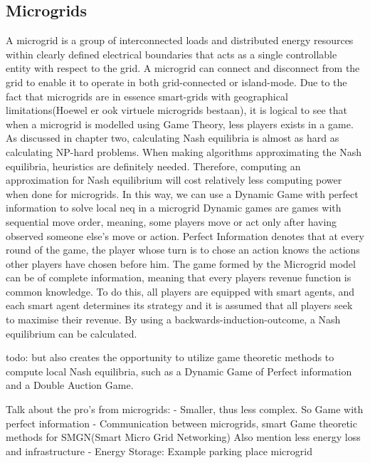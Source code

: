 \subsection{Microgrids}
A microgrid is a group of interconnected loads and distributed energy resources within clearly defined electrical boundaries that acts as a single controllable entity with respect to the grid. A microgrid can connect and disconnect from the grid to enable it to operate in both grid-connected or island-mode.
Due to the fact that microgrids are in essence smart-grids with geographical limitations(Hoewel er ook virtuele microgrids bestaan), it is logical to see that when a microgrid is modelled using Game Theory, less players exists in a game. As discussed in chapter two, calculating Nash equilibria is almost as hard as calculating NP-hard problems. When making algorithms approximating the Nash equilibria, heuristics are definitely needed. Therefore, computing an approximation for Nash equilibrium will cost relatively less computing power when done for microgrids. In this way, we can use a Dynamic Game with perfect information to solve local \ac{neq} in a microgrid
Dynamic games are games with sequential move order, meaning, some players move or act only after having observed someone else’s move or action. Perfect Information denotes that at every round of the game, the player whose turn is to chose an action knows the actions other players have chosen before him. The game formed by the Microgrid model can be of complete information, meaning that every players revenue function is common knowledge.
To do this, all players are equipped with smart agents, and each smart agent determines its strategy and it is assumed that all players seek to maximise their revenue. By using a backwards-induction-outcome, a Nash equilibrium can be calculated.\cite{MicrogridModellingPetrosAristidou}

todo: 
but also creates the opportunity to utilize game theoretic methods to compute local Nash equilibria, such as a Dynamic Game of Perfect information and a Double Auction Game.


Talk about the pro's from microgrids:
 - Smaller, thus less complex. So Game with perfect information
 - Communication between microgrids, smart Game theoretic methods for SMGN(Smart Micro Grid Networking) Also mention less energy loss and infrastructure
 - Energy Storage: Example parking place microgrid

